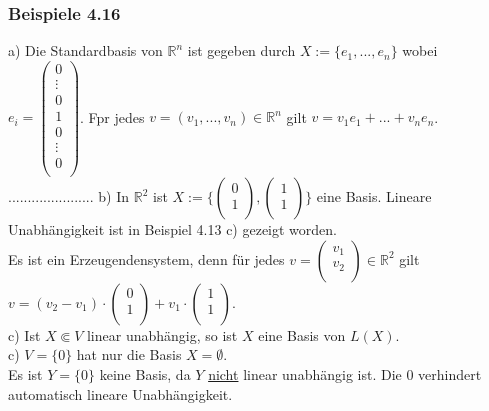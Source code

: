 \documentclass{article}
\begin{document}
\subsubsection*{Beispiele 4.16}
a) Die Standardbasis von $\mathbb{R}^n$ ist gegeben durch $X:= \{e_1,...,e_n\}$ wobei $e_i = \begin{pmatrix}
    0 \\
    \vdots \\
    0 \\
    1 \\
    0 \\
    \vdots \\
    0 \\
\end{pmatrix}$. Fpr jedes $v = (v_1,...,v_n) \in \mathbb{R}^n$ gilt $v = v_1 e_1 + ... + v_n e_n$. ......................
b) In $\mathbb{R}^2$ ist $X := \{ \begin{pmatrix}
    0 \\
    1 \\
    \end{pmatrix}, \begin{pmatrix}
        1 \\
        1 \\
    \end{pmatrix} \}$ eine Basis. Lineare Unabhängigkeit ist in Beispiel 4.13 c) gezeigt worden. \\
Es ist ein Erzeugendensystem, denn für jedes $v = \begin{pmatrix}
    v_1 \\
    v_2 \\
    \end{pmatrix} \in \mathbb{R}^2$ gilt $v = (v_2 - v_1) \cdot \begin{pmatrix}
        0 \\
        1 \\
    \end{pmatrix} + v_1 \cdot \begin{pmatrix}
        1 \\
        1 \\
    \end{pmatrix}$. \\
c) Ist $X \Subset V$ linear unabhängig, so ist $X$ eine Basis von $L(X)$. \\
c) $V = \{0\}$ hat nur die Basis $X = \emptyset$. \\
Es ist $Y = \{0\}$ keine Basis, da $Y$ \underline{nicht} linear unabhängig ist. Die 0 verhindert automatisch lineare Unabhängigkeit. \\
\end{document}
